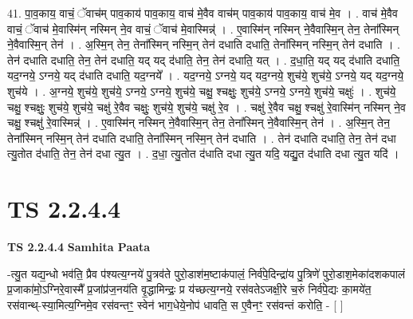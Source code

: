\documentclass[17pt]{extarticle}
\begin{document}
41. पा॒व॒काय॒ वाचं॒ ॅवाच॑म् पाव॒काय॑ पाव॒काय॒ वाच॑ मे॒वैव वाच॑म् पाव॒काय॑ पाव॒काय॒ वाच॑ मे॒व । . वाच॑ मे॒वैव वाचं॒ ॅवाच॑ मे॒वास्मि॑न् नस्मिन् ने॒व वाचं॒ ॅवाच॑ मे॒वास्मिन्न्॑ । . ए॒वास्मि॑न् नस्मिन् ने॒वैवास्मि॒न् तेन॒ तेना᳚स्मिन् ने॒वैवास्मि॒न् तेन॑ । . अ॒स्मि॒न् तेन॒ तेना᳚स्मिन् नस्मि॒न् तेन॑ दधाति दधाति॒ तेना᳚स्मिन् नस्मि॒न् तेन॑ दधाति । . तेन॑ दधाति दधाति॒ तेन॒ तेन॑ दधाति॒ यद् यद् द॑धाति॒ तेन॒ तेन॑ दधाति॒ यत् । . द॒धा॒ति॒ यद् यद् द॑धाति दधाति॒ यद॒ग्नये॒ ऽग्नये॒ यद् द॑धाति दधाति॒ यद॒ग्नये᳚ । . यद॒ग्नये॒ ऽग्नये॒ यद् यद॒ग्नये॒ शुच॑ये॒ शुच॑ये॒ ऽग्नये॒ यद् यद॒ग्नये॒ शुच॑ये । . अ॒ग्नये॒ शुच॑ये॒ शुच॑ये॒ ऽग्नये॒ ऽग्नये॒ शुच॑ये॒ चक्षु॒ श्चक्षुः॒ शुच॑ये॒ ऽग्नये॒ ऽग्नये॒ शुच॑ये॒ चक्षुः॑ । . शुच॑ये॒ चक्षु॒ श्चक्षुः॒ शुच॑ये॒ शुच॑ये॒ चक्षु॑ रे॒वैव चक्षुः॒ शुच॑ये॒ शुच॑ये॒ चक्षु॑ रे॒व । . चक्षु॑ रे॒वैव चक्षु॒ श्चक्षु॑ रे॒वास्मि॑न् नस्मिन् ने॒व चक्षु॒ श्चक्षु॑ रे॒वास्मिन्न्॑ । . ए॒वास्मि॑न् नस्मिन् ने॒वैवास्मि॒न् तेन॒ तेना᳚स्मिन् ने॒वैवास्मि॒न् तेन॑ । . अ॒स्मि॒न् तेन॒ तेना᳚स्मिन् नस्मि॒न् तेन॑ दधाति दधाति॒ तेना᳚स्मिन् नस्मि॒न् तेन॑ दधाति । . तेन॑ दधाति दधाति॒ तेन॒ तेन॑ दधा त्यु॒तोत द॑धाति॒ तेन॒ तेन॑ दधा त्यु॒त । . द॒धा॒ त्यु॒तोत द॑धाति दधा त्यु॒त यदि॒ यद्यु॒त द॑धाति दधा त्यु॒त यदि॑ । \newline
\pagebreak
{}
\section*{ TS 2.2.4.4 }

\textbf{TS 2.2.4.4 } \newline
\textbf{Samhita Paata} \newline

-त्यु॒त यद्य॒न्धो भव॑ति॒ प्रैव प॑श्यत्य॒ग्नये॑ पु॒त्रव॑ते पुरो॒डाश॑म॒ष्टाक॑पालं॒ निर्व॑पे॒दिन्द्रा॑य पु॒त्रिणे॑ पुरो॒डाश॒मेका॑दशकपालं प्र॒जाका॑मो॒ऽग्निरे॒वास्मै᳚ प्र॒जांप्र॑ज॒नय॑ति वृ॒द्धामिन्द्रः॒ प्र य॑च्छत्य॒ग्नये॒ रस॑वतेऽजक्षी॒रे च॒रुं निर्व॑पे॒द्यः का॒मये॑त॒ रस॑वान्थ्-स्या॒मित्य॒ग्निमे॒व रस॑वन्तꣳ॒॒ स्वेन॑ भाग॒धेये॒नोप॑ धावति॒ स ए॒वैनꣳ॒॒ रस॑वन्तं करोति॒ - [  ] \newline
\end{document}
